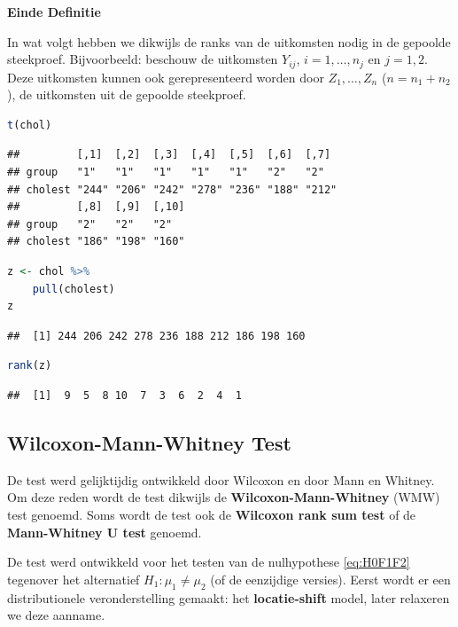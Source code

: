 \documentclass[
  12pt,dutch,coursenotes]{book}
\begin{document}
\textbf{Einde Definitie}

In wat volgt hebben we dikwijls de ranks van de uitkomsten nodig in de gepoolde steekproef. Bijvoorbeeld: beschouw de uitkomsten \(Y_{ij}\), \(i=1,\ldots, n_j\) en \(j=1,2\).
Deze uitkomsten kunnen ook gerepresenteerd worden door \(Z_1,\ldots, Z_n\) (\(n=n_1+n_2\)), de uitkomsten uit de gepoolde steekproef.

\begin{lstlisting}[language=R]
t(chol)
\end{lstlisting}

\begin{lstlisting}
##         [,1]  [,2]  [,3]  [,4]  [,5]  [,6]  [,7] 
## group   "1"   "1"   "1"   "1"   "1"   "2"   "2"  
## cholest "244" "206" "242" "278" "236" "188" "212"
##         [,8]  [,9]  [,10]
## group   "2"   "2"   "2"  
## cholest "186" "198" "160"
\end{lstlisting}

\begin{lstlisting}[language=R]
z <- chol %>%
    pull(cholest)
z
\end{lstlisting}

\begin{lstlisting}
##  [1] 244 206 242 278 236 188 212 186 198 160
\end{lstlisting}

\begin{lstlisting}[language=R]
rank(z)
\end{lstlisting}

\begin{lstlisting}
##  [1]  9  5  8 10  7  3  6  2  4  1
\end{lstlisting}

\hypertarget{wilcoxon-mann-whitney-test}{%
\subsection{Wilcoxon-Mann-Whitney Test}\label{wilcoxon-mann-whitney-test}}

De test werd gelijktijdig ontwikkeld door Wilcoxon en door Mann en Whitney. Om deze reden wordt de test dikwijls de \textbf{Wilcoxon-Mann-Whitney} (WMW) test genoemd. Soms wordt de test ook de \textbf{Wilcoxon rank sum test} of de \textbf{Mann-Whitney U test} genoemd.

De test werd ontwikkeld voor het testen van de nulhypothese \eqref{eq:H0F1F2} tegenover het alternatief \(H_1: \mu_1\neq \mu_2\) (of de eenzijdige versies). Eerst wordt er een distributionele veronderstelling gemaakt: het \textbf{locatie-shift} model, later relaxeren we deze aanname.
\end{document}
